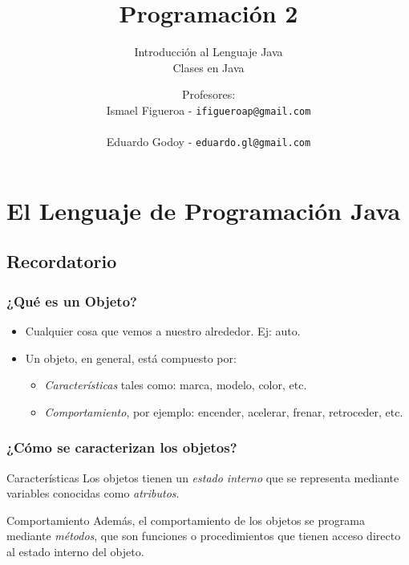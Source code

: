 \documentclass{beamer}
\title[\textbf{Programación 2}]{\textbf{Programación 2}}
\subtitle{Introducción al Lenguaje Java\\Clases en Java}
\author[IF-EG]
{Profesores:\\
  Ismael Figueroa -  \texttt{\small ifigueroap@gmail.com} \\
  \vspace{0.5mm} \\
  Eduardo Godoy - \texttt{\small eduardo.gl@gmail.com}
}
\institute[Universidad de Valparaíso]
\date{}
\begin{document}
\begin{frame}
  \titlepage
\end{frame}


\section{El Lenguaje de Programación Java}

\subsection{Recordatorio}

\begin{frame}
  \frametitle{¿Qué es un Objeto?}

  \begin{exampleblock}{}
    \begin{itemize}
    \item[] Cualquier cosa que vemos a nuestro alrededor. Ej: auto.
    \item[] Un objeto, en general, está compuesto por:
      \begin{itemize}
      \item \emph{Características} tales como: marca, modelo, color, etc.
      \item \emph{Comportamiento}, por ejemplo: encender, acelerar, frenar, retroceder, etc.
      \end{itemize}
    \end{itemize}
  \end{exampleblock}
\end{frame}

\begin{frame}
  \frametitle{¿Cómo se caracterizan los objetos?}

  \begin{block}{Características}
    Los objetos tienen un \emph{estado interno} que se representa
    mediante variables conocidas como \emph{atributos}.
  \end{block}

  \begin{block}{Comportamiento}
    Además, el comportamiento de los objetos se programa mediante
    \emph{métodos}, que son funciones o procedimientos que tienen acceso
    directo al estado interno del objeto.
  \end{block}

\end{frame}
\end{document}
